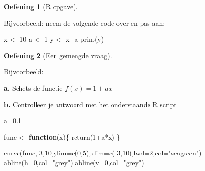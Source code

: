 \documentclass[
  a4paper,
]{scrbook}
\newenvironment{Shaded}{\begin{snugshade}}{\end{snugshade}}
\newcommand{\AttributeTok}[1]{\textcolor[rgb]{0.40,0.45,0.13}{#1}}
\newcommand{\ControlFlowTok}[1]{\textcolor[rgb]{0.00,0.23,0.31}{\textbf{#1}}}
\newcommand{\DecValTok}[1]{\textcolor[rgb]{0.68,0.00,0.00}{#1}}
\newcommand{\FloatTok}[1]{\textcolor[rgb]{0.68,0.00,0.00}{#1}}
\newcommand{\FunctionTok}[1]{\textcolor[rgb]{0.28,0.35,0.67}{#1}}
\newcommand{\NormalTok}[1]{\textcolor[rgb]{0.00,0.23,0.31}{#1}}
\newcommand{\OtherTok}[1]{\textcolor[rgb]{0.00,0.23,0.31}{#1}}
\newcommand{\SpecialCharTok}[1]{\textcolor[rgb]{0.37,0.37,0.37}{#1}}
\newcommand{\StringTok}[1]{\textcolor[rgb]{0.13,0.47,0.30}{#1}}
\theoremstyle{definition}
\newtheorem{exercise}{Oefening}[chapter]
\theoremstyle{remark}
\begin{document}
\begin{exercise}[R
opgave]\protect\hypertarget{exr-Rexer}{}\label{exr-Rexer}

Bijvoorbeeld: neem de volgende code over en pas aan:

\begin{Shaded}
\begin{Highlighting}[]
\NormalTok{x }\OtherTok{\textless{}{-}} \DecValTok{10}
\NormalTok{a }\OtherTok{\textless{}{-}} \DecValTok{1}
\NormalTok{y }\OtherTok{\textless{}{-}}\NormalTok{ x}\SpecialCharTok{+}\NormalTok{a}
\FunctionTok{print}\NormalTok{(y)}
\end{Highlighting}
\end{Shaded}

\end{exercise}

\begin{exercise}[Een gemengde
vraag]\protect\hypertarget{exr-mixedexample}{}\label{exr-mixedexample}

Bijvoorbeeld:

\textbf{a.} Schets de functie \(f(x)=1+ax\)

\textbf{b.} Controlleer je antwoord met het onderstaande R script

\begin{Shaded}
\begin{Highlighting}[]
\NormalTok{a}\OtherTok{=}\FloatTok{0.1}

\NormalTok{func }\OtherTok{\textless{}{-}} \ControlFlowTok{function}\NormalTok{(x)\{}
 \FunctionTok{return}\NormalTok{(}\DecValTok{1}\SpecialCharTok{+}\NormalTok{a}\SpecialCharTok{*}\NormalTok{x)}
\NormalTok{\}}

\FunctionTok{curve}\NormalTok{(func,}\SpecialCharTok{{-}}\DecValTok{3}\NormalTok{,}\DecValTok{10}\NormalTok{,}\AttributeTok{ylim=}\FunctionTok{c}\NormalTok{(}\DecValTok{0}\NormalTok{,}\DecValTok{5}\NormalTok{),}\AttributeTok{xlim=}\FunctionTok{c}\NormalTok{(}\SpecialCharTok{{-}}\DecValTok{3}\NormalTok{,}\DecValTok{10}\NormalTok{),}\AttributeTok{lwd=}\DecValTok{2}\NormalTok{,}\AttributeTok{col=}\StringTok{"seagreen"}\NormalTok{)}
\FunctionTok{abline}\NormalTok{(}\AttributeTok{h=}\DecValTok{0}\NormalTok{,}\AttributeTok{col=}\StringTok{"grey"}\NormalTok{)}
\FunctionTok{abline}\NormalTok{(}\AttributeTok{v=}\DecValTok{0}\NormalTok{,}\AttributeTok{col=}\StringTok{"grey"}\NormalTok{)}
\end{Highlighting}
\end{Shaded}

\end{exercise}
\end{document}
